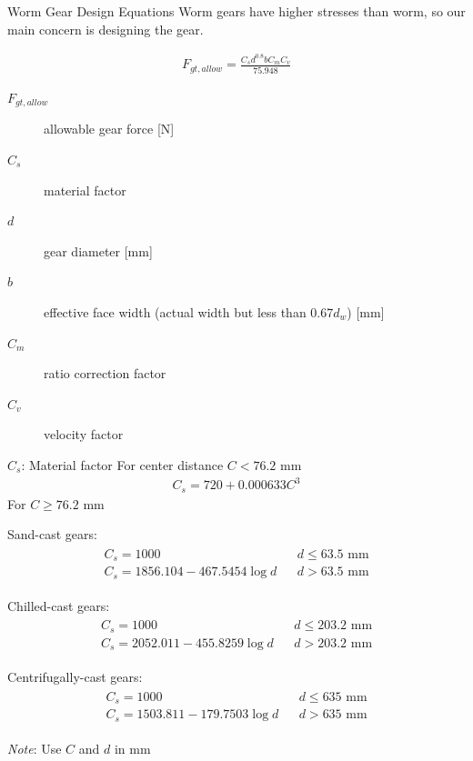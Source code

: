 \documentclass[10pt, svgnames]{beamer}
\begin{document}
\begin{frame}[label={sec:orga25b089}]{Worm Gear Design Equations}
Worm gears have higher stresses than worm, so our main concern is designing the gear.

\begin{align*}
    F_{gt, allow} = \frac{C_{s}d^{0.8}bC_{m}C_{v}}{75.948}
\end{align*}

\begin{description}
\item[{\(F_{gt, allow}\)}] allowable gear force [N]

\item[{\(C_s\)}] material factor

\item[{\(d\)}] gear diameter [mm]

\item[{\(b\)}] effective face width (actual width but less than
0.67\(d_{w}\)) [mm]

\item[{\(C_{m}\)}] ratio correction factor

\item[{\(C_{v}\)}] velocity factor
\end{description}
\end{frame}

\begin{frame}[label={sec:orgdb0d858}]{\(C_{s}\): Material factor}
For center distance \(C < 76.2\) mm
\begin{align*}
    C_{s} = 720 + 0.000633C^{3}
\end{align*}
For \(C \geqslant 76.2\) mm

Sand-cast gears:
\begin{align*}
    \begin{array}{lll}
      C_{s} = 1000 &  & d \leqslant 63.5 \text{ mm} \\
      C_{s} = 1856.104 - 467.5454 \log d &  & d > 63.5 \text{ mm}
    \end{array}
\end{align*}

Chilled-cast gears:
\begin{align*}
    \begin{array}{lll}
      C_{s} = 1000 &  & d \leqslant 203.2 \text{ mm} \\
      C_{s} = 2052.011 - 455.8259 \log d &  & d > 203.2 \text{ mm}
    \end{array}
\end{align*}

Centrifugally-cast gears:
\begin{align*}
    \begin{array}{lll}
      C_{s} = 1000 &  & d \leqslant 635 \text{ mm} \\
      C_{s} = 1503.811 - 179.7503 \log d &  & d > 635 \text{ mm}
    \end{array}
\end{align*}

\emph{Note}: Use \(C\) and \(d\) in mm
\end{frame}
\end{document}
